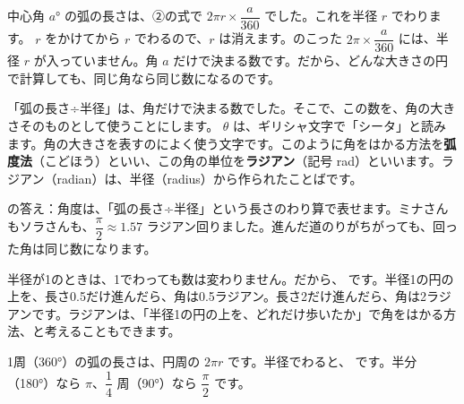 中心角 $a$° の弧の長さは、②の式で $2\pi r\times\dfrac{a}{360}$ でした。これを半径 $r$ でわります。
$r$ をかけてから $r$ でわるので、$r$ は消えます。のこった $2\pi\times\dfrac{a}{360}$ には、半径 $r$ が入っていません。角 $a$ だけで決まる数です。だから、どんな大きさの円で計算しても、同じ角なら同じ数になるのです。

「弧の長さ÷半径」は、角だけで決まる数でした。そこで、この数を、角の大きさそのものとして使うことにします。
$\theta$ は、ギリシャ文字で「シータ」と読みます。角の大きさを表すのによく使う文字です。このように角をはかる方法を\textbf{弧度法}（こどほう）といい、この角の単位を\textbf{ラジアン}（記号 rad）といいます。ラジアン（radian）は、半径（radius）から作られたことばです。

\bkhatenaref の答え：角度は、「弧の長さ÷半径」という長さのわり算で表せます。ミナさんもソラさんも、$\dfrac{\pi}{2}\approx1.57$ ラジアン回りました。進んだ道のりがちがっても、回った角は同じ数になります。

半径が1のときは、1でわっても数は変わりません。だから、
です。半径1の円の上を、長さ0.5だけ進んだら、角は0.5ラジアン。長さ2だけ進んだら、角は2ラジアンです。ラジアンは、「半径1の円の上を、どれだけ歩いたか」で角をはかる方法、と考えることもできます。

1周（360°）の弧の長さは、円周の $2\pi r$ です。半径でわると、
です。半分（180°）なら $\pi$、$\dfrac{1}{4}$ 周（90°）なら $\dfrac{\pi}{2}$ です。

